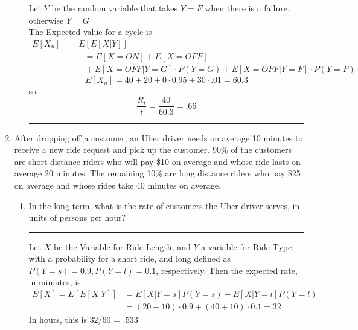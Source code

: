 \documentclass{article} %
\theoremstyle{plain}
\theoremstyle{case}
\begin{document}
\begin{enumerate}[label={\fbox{\textbf{Exercise \#\arabic* :}}}]
\begin{enumerate}
        Let $Y$ be the random variable that takes $Y=F$ when there is a
        failure, otherwise $Y=G$\\
       The Expected value for a cycle is
       \begin{equation*}\begin{split}
         E[X_n] &= E[E[X|Y]] \\
                &\qquad = E[X=ON] + E[X=OFF] \\
                    &\qquad + E[X=OFF|Y=G] \cdot P(Y=G) 
                            + E[X=OFF|Y=F] \cdot P(Y=F)
       \end{split}\end{equation*}
       \[ E[X_n] = 40 + 20  + 0 \cdot 0.95 + 30 \cdot .01 = 60.3 \]
       so
       \[ \frac{R_t}{t} = \frac{40}{60.3} = .66 \]
\par\noindent\rule{\textwidth}{0.1pt}
    \end{enumerate}
  \newpage
  \item After dropping off a customer, an Uber driver needs on average 10
    minutes to receive a new ride request and pick up the customer.
    90\% of the customers are short distance riders who will pay
    \$10 on average and whose ride lasts on average 20 minutes.
    The remaining 10\% are long distance riders who pay \$25 on
    average and whose rides take 40 minutes on average.
    \begin{enumerate}
      \item In the long term, what is the rate of customers the Uber driver serves, in units of persons per hour?
\par\noindent\rule{\textwidth}{0.1pt}
        Let $X$ be the Variable for Ride Length, and $Y$ a variable for
        Ride Type, with a probability for a short ride, and long 
        defined as $P(Y=s) = 0.9, P(Y=l) = 0.1$, respectively.  Then
        the expected rate, in mimutes, is
       \begin{align*}
         E[X] = E[E[X|Y]] &= E[X|Y=s]P(Y=s) + E[X|Y=l]P(Y=l)   \\
                          &= (20+10) \cdot 0.9 + (40+10) \cdot 0.1 = 32
       \end{align*}
       In hours, this is $32/60$ = .533


\end{enumerate}
\end{enumerate}
\end{document}
